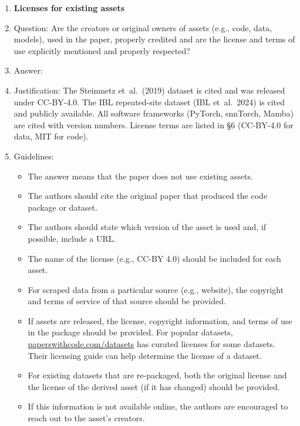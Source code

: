 \begin{enumerate}
\item {\bf Licenses for existing assets}
    \item[] Question: Are the creators or original owners of assets (e.g., code, data, models), used in the paper, properly credited and are the license and terms of use explicitly mentioned and properly respected?
    \item[] Answer: \answerYes{}
    \item[] Justification: The Steinmetz et~al.\ (2019) dataset is
      cited and was released under CC-BY-4.0.  The IBL repeated-site
      dataset (IBL et~al.\ 2024) is cited and publicly available.  All software
      frameworks (PyTorch, snnTorch, Mamba) are cited with version
      numbers.  License terms are listed in \S6 (CC-BY-4.0 for data,
      MIT for code).
    \item[] Guidelines:
    \begin{itemize}
        \item The answer \answerNA{} means that the paper does not use existing assets.
        \item The authors should cite the original paper that produced the code package or dataset.
        \item The authors should state which version of the asset is used and, if possible, include a URL.
        \item The name of the license (e.g., CC-BY 4.0) should be included for each asset.
        \item For scraped data from a particular source (e.g., website), the copyright and terms of service of that source should be provided.
        \item If assets are released, the license, copyright information, and terms of use in the package should be provided. For popular datasets, \url{paperswithcode.com/datasets} has curated licenses for some datasets. Their licensing guide can help determine the license of a dataset.
        \item For existing datasets that are re-packaged, both the original license and the license of the derived asset (if it has changed) should be provided.
        \item If this information is not available online, the authors are encouraged to reach out to the asset's creators.
    \end{itemize}


\end{enumerate}
